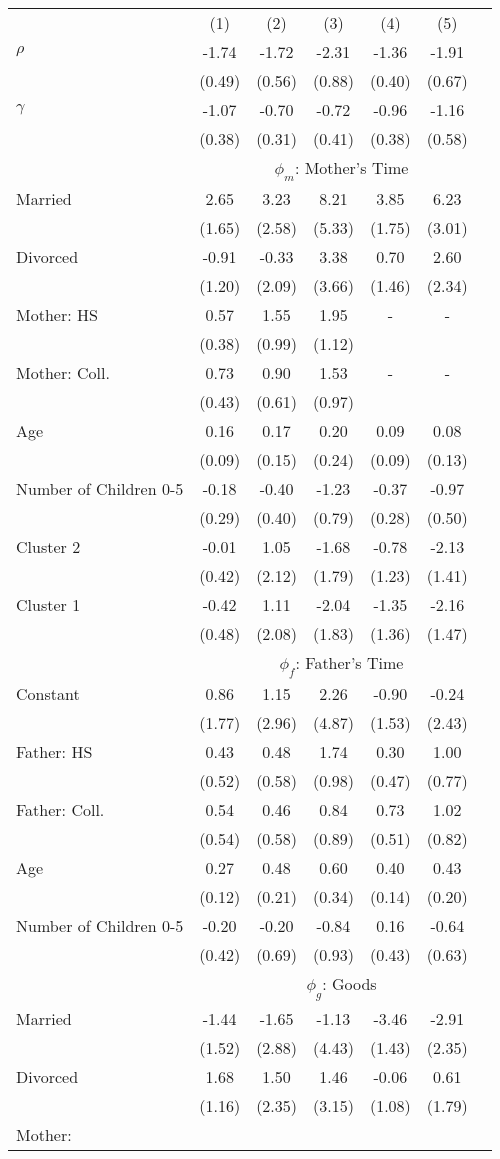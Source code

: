 \begin{tabular}{lcccccc}\\\toprule
&(1)&(2)&(3)&(4)&(5)&\\\cmidrule(r){2-7}$\rho$&-1.74&-1.72&-2.31&-1.36&-1.91&\\
&(0.49)&(0.56)&(0.88)&(0.40)&(0.67)&\\
$\gamma$&-1.07&-0.70&-0.72&-0.96&-1.16&\\
&(0.38)&(0.31)&(0.41)&(0.38)&(0.58)&\\
& \multicolumn{6}{c}{$\phi_{m}$: Mother's Time}\\\cmidrule(r){2-7}Married&2.65&3.23&8.21&3.85&6.23&\\&(1.65)&(2.58)&(5.33)&(1.75)&(3.01)&\\Divorced&-0.91&-0.33&3.38&0.70&2.60&\\&(1.20)&(2.09)&(3.66)&(1.46)&(2.34)&\\Mother: HS&0.57&1.55&1.95&-&-&\\&(0.38)&(0.99)&(1.12)&&&\\Mother: Coll.&0.73&0.90&1.53&-&-&\\&(0.43)&(0.61)&(0.97)&&&\\Age&0.16&0.17&0.20&0.09&0.08&\\&(0.09)&(0.15)&(0.24)&(0.09)&(0.13)&\\Number of Children 0-5&-0.18&-0.40&-1.23&-0.37&-0.97&\\&(0.29)&(0.40)&(0.79)&(0.28)&(0.50)&\\Cluster 2&-0.01&1.05&-1.68&-0.78&-2.13&\\&(0.42)&(2.12)&(1.79)&(1.23)&(1.41)&\\Cluster 1&-0.42&1.11&-2.04&-1.35&-2.16&\\&(0.48)&(2.08)&(1.83)&(1.36)&(1.47)&\\& \multicolumn{6}{c}{$\phi_{f}$: Father's Time}\\\cmidrule(r){2-7}Constant&0.86&1.15&2.26&-0.90&-0.24&\\&(1.77)&(2.96)&(4.87)&(1.53)&(2.43)&\\Father: HS&0.43&0.48&1.74&0.30&1.00&\\&(0.52)&(0.58)&(0.98)&(0.47)&(0.77)&\\Father: Coll.&0.54&0.46&0.84&0.73&1.02&\\&(0.54)&(0.58)&(0.89)&(0.51)&(0.82)&\\Age&0.27&0.48&0.60&0.40&0.43&\\&(0.12)&(0.21)&(0.34)&(0.14)&(0.20)&\\Number of Children 0-5&-0.20&-0.20&-0.84&0.16&-0.64&\\&(0.42)&(0.69)&(0.93)&(0.43)&(0.63)&\\& \multicolumn{6}{c}{$\phi_{g}$: Goods}\\\cmidrule(r){2-7}Married&-1.44&-1.65&-1.13&-3.46&-2.91&\\&(1.52)&(2.88)&(4.43)&(1.43)&(2.35)&\\Divorced&1.68&1.50&1.46&-0.06&0.61&\\&(1.16)&(2.35)&(3.15)&(1.08)&(1.79)&\\Mother: 
\end{tabular}
